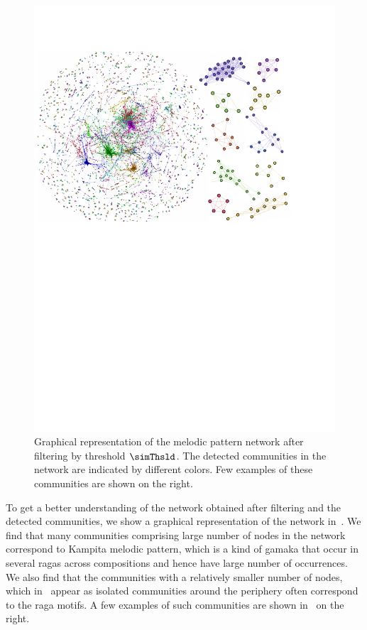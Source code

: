 {\begin{figure}
	\begin{center}
		\includegraphics[width=\figSizeHundred]{ch06_patterns/figures/Characterization/networkWithClusters.pdf}
	\end{center}
 \caption[Graphical representation of a network of melodic patterns]{Graphical representation of the melodic pattern network after filtering by threshold $\simThsld$. The detected communities in the network are indicated by different colors. Few examples of these communities are shown on the right.}
 \label{fig:network_and_communities_pattern_characterization}
\end{figure}

To get a better understanding of the network obtained after filtering and the detected communities, we show a graphical representation of the network in~. We find that many communities comprising large number of nodes in the network correspond to Kampita melodic pattern, which is a kind of \gls{gamaka} that occur in several \glspl{raga} across compositions and hence have large number of occurrences. We also find that the communities with a relatively smaller number of nodes, which in~ appear as isolated communities around the periphery often correspond to the \gls{raga} motifs. A few examples of such communities are shown in~ on the right.

}
